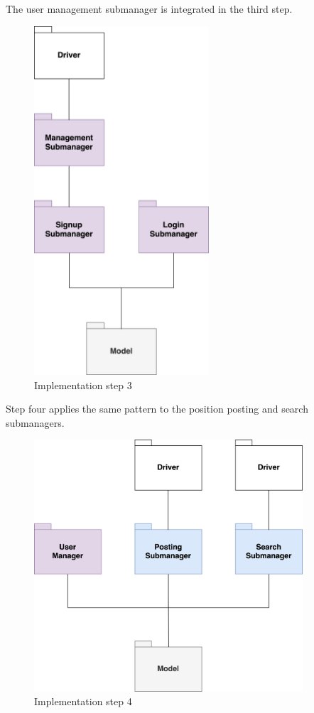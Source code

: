 \newpage
The user management submanager is integrated in the third step.

\begin{figure}[h]
    \centering
    \includegraphics[width=6.5cm]{images/implementation-diagrams/step-3.png}
    \caption{Implementation step 3}
\end{figure}

\newpage
Step four applies the same pattern to the position posting and search submanagers.

\begin{figure}[h]
    \centering
    \includegraphics[width=10cm]{images/implementation-diagrams/step-4.png}
    \caption{Implementation step 4}
\end{figure}

